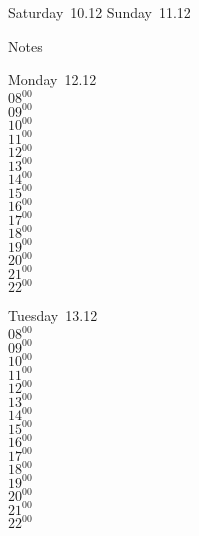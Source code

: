 \documentclass[11pt,a4paper]{book}\usepackage[]{graphicx}\usepackage[]{color}
\begin{document}
\begin{weekendbox}
  Saturday~10.12
  \tcblower
  Sunday~11.12
\end{weekendbox} %
\begin{notebox}
  Notes
\end{notebox}
\clearpage
\begin{headerbox}
\end{headerbox}
\begin{weekdaybox}
  Monday~12.12\\
  { 
  \vfill
  $08^{00}$\\
$09^{00}$\\
$10^{00}$\\
$11^{00}$\\
$12^{00}$\\
$13^{00}$\\
$14^{00}$\\
$15^{00}$\\
$16^{00}$\\
$17^{00}$\\
$18^{00}$\\
$19^{00}$\\
$20^{00}$\\
$21^{00}$\\
$22^{00}$\\
  }
\end{weekdaybox}
\begin{weekdaybox}
  Tuesday~13.12\\
  { 
  \vfill
  $08^{00}$\\
$09^{00}$\\
$10^{00}$\\
$11^{00}$\\
$12^{00}$\\
$13^{00}$\\
$14^{00}$\\
$15^{00}$\\
$16^{00}$\\
$17^{00}$\\
$18^{00}$\\
$19^{00}$\\
$20^{00}$\\
$21^{00}$\\
$22^{00}$\\
  }
\end{weekdaybox}
\end{document}
